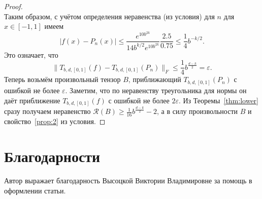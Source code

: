 \documentclass[3p]{cmmp}%
\numberwithin{equation}{section}
\begin{document}
\begin{proof}
\[	\]
	Таким образом, с учётом определения неравенства (из условия) для $n$ для $x \in [-1,1]$ имеем
	\[
	|f(x) - P_n(x)| \leq \frac{e^{10b^{2k}}}{14b^{k/2}e^{10b^{2k}}} \frac{2.5}{0.75} \leq \frac{1}{4}b^{-k/2}.
	\]
	Это означает, что
	\[
	\|T_{b,d,[0,1]}(f) - T_{b,d,[0,1]}(P_n)\|_F \leq \frac{1}{4}b^{\frac{d-k}{2}} = \varepsilon.
	\]
	Теперь возьмём произвольный тензор $B$, приближающий $T_{b,d,[0,1]}(P_n)$ с ошибкой не более $\varepsilon$.
	Заметим, что по неравенству треугольника для нормы он даёт приближение $T_{b,d,[0,1]}(f)$ с ошибкой не более $2\varepsilon$.
	Из Теоремы~\ref{thm:lower} сразу получаем неравенство $\mathcal{R}(B) \geq \frac{1}{16}b^{\frac{d-k}{2}} - 2$, а в силу произвольности $B$ и свойство~\ref{prop:2} из условия.
\end{proof}
\section*{Благодарности}
Автор выражает благодарность Высоцкой Виктории Владимировне за помощь в оформлении статьи.



\end{document}
